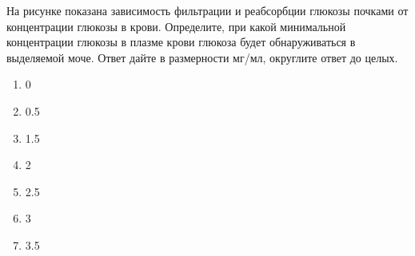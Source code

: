 
На рисунке показана зависимость фильтрации и
реабсорбции глюкозы почками от концентрации глюкозы в крови. Определите, при
какой минимальной концентрации глюкозы в плазме крови глюкоза будет
обнаруживаться в выделяемой моче. Ответ дайте в размерности мг/мл, округлите
ответ до целых.


\begin{enumerate}
    \item 0
    \item 0.5
    \item 1.5
    \item 2
    \item 2.5
    \item 3
    \item 3.5
\end{enumerate}

\explanationSection

